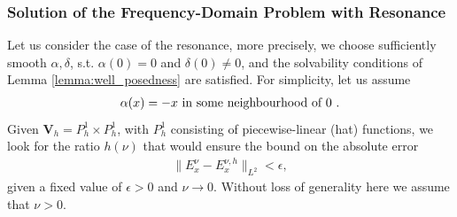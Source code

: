 \subsubsection{Solution of the Frequency-Domain Problem with Resonance}
Let us consider the case of the resonance, more precisely, we choose sufficiently smooth
$\alpha,\delta$, s.t. $\alpha(0)=0$ and $\delta(0)\neq 0$, and the solvability conditions 
of Lemma \ref{lemma:well_posedness}  are satisfied. 
For simplicity, let us assume 
\begin{align}
\label{eq:cond}
 \alpha(x)=-x \text{  in some neighbourhood of $0$ }.
\end{align}
Given $\mathbf{V}_{h}=P_{h}^{1}\times P_{h}^{1}$, with $P_{h}^{1}$ consisting of piecewise-linear (hat) functions, 
we look for the ratio $h(\nu)$ that would ensure the bound on the absolute error 
\begin{align}
\label{eq:problem1}
\|E^{\nu}_{x}-E^{\nu,h}_{x}\|_{L^2}<\epsilon,
\end{align}
given a fixed value of $\epsilon>0$ and $\nu\rightarrow 0$. Without loss of generality here we assume that $\nu>0$. 

